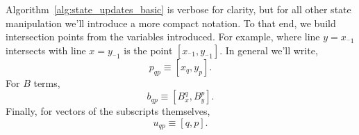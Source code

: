Algorithm~\ref{alg:state_updates_basic} is verbose for clarity,
but for all other state manipulation we'll introduce a more compact
notation.  To that end, we build
 intersection points from the variables introduced.
For example,
where line $y = x_{^-1}$ intersects with line $x = y_{^-1}$ is
the point $[x_{^-1}, y_{^-1}]$.  In general we'll write,
\begin{equation} \label{eq:p_sm}
  p_{qp} \equiv [x_q, y_p].
\end{equation}
For $B$ terms,
\begin{equation}
  b_{qp} \equiv [B_x^q, B_y^p].
  \label{eq:b_sm}
\end{equation}
Finally, for vectors of the subscripts themselves,
\begin{equation}
  u_{qp} \equiv [q, p].
  \label{eq:u_sm}
\end{equation}

